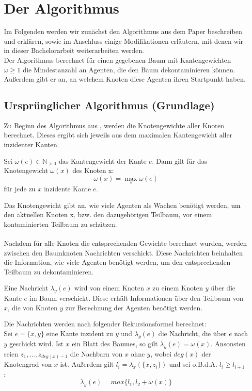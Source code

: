 \section{Der Algorithmus}\label{kap_algorithmus}
Im Folgenden werden wir zunächst den Algorithmus aus dem Paper \cite{cima_paper} beschreiben und erklären, sowie im Anschluss einige Modifikationen erläutern, mit denen wir in dieser Bachelorarbeit weiterarbeiten werden.\\
Der Algorithmus berechnet für einen gegebenen Baum mit Kantengewichten $\omega \geq 1$ die Mindestanzahl an Agenten, die den Baum dekontaminieren können. Außerdem gibt er an, an welchem Knoten diese Agenten ihren Startpunkt haben.


\subsection{Ursprünglicher Algorithmus (Grundlage)}\label{paperAlgoChapter}

Zu Beginn des Algorithmus aus \cite{cima_paper}, werden die Knotengewichte aller Knoten berechnet. Dieses ergibt sich jeweils aus dem maximalen Kantengewicht aller inzidenter Kanten. 

\begin{mydef}
	Sei $\omega(e) \in \mathbb N_{> 0}$ das Kantengewicht der Kante $e$. Dann gilt für das Knotengewicht $\omega(x)$ des Knoten x:   $$\omega(x) = \max_{e} \omega(e)$$ für jede zu $x$ inzidente Kante $e$.
\end{mydef}

Das Knotengewicht gibt an, wie viele Agenten als Wachen benötigt werden, um den aktuellen Knoten x, bzw. den dazugehörigen Teilbaum, vor einem kontaminierten Teilbaum zu schützen.
\\
\\
Nachdem für alle Knoten die entsprechenden Gewichte berechnet wurden, werden zwischen den Baumknoten Nachrichten verschickt. Diese Nachrichten beinhalten die Information, wie viele Agenten benötigt werden, um den entsprechenden Teilbaum zu dekontaminieren.  

\begin{mydef}\label{def_nachricht}
	Eine Nachricht $\lambda_{y}(e)$ wird von einem Knoten $x$ zu einem Knoten $y$ über die Kante $e$ im Baum verschickt. Diese erhält Informationen über den Teilbaum von $x$, die von Knoten $y$ zur Berechnung der Agenten benötigt werden.
\end{mydef}

Die Nachrichten werden nach folgender Rekursionsformel \cite{cima_paper} berechnet:\\
Sei $e = \{x, y\}$ eine Kante inzident zu $y$ und $\lambda_{y}(e)$ die Nachricht, die über $e$ nach $y$ geschickt wird. Ist $x$ ein Blatt des Baumes, so gilt $\lambda_{y}(e) = \omega(x)$. Ansonsten seien $z_{1}, ..., z_{deg(x)-1}$ die Nachbarn von $x$ ohne $y$, wobei $deg(x)$ der Knotengrad von $x$ ist.  Außerdem gilt $l_{i} = \lambda_{x}(\{x, z_{i}\})$ und sei o.B.d.A. $l_{i} \geq l_{i+1}$ \cite{cima_paper}: $$\lambda_{y}(e) = max \{l_{1}, l_{2} + \omega(x)\}$$

